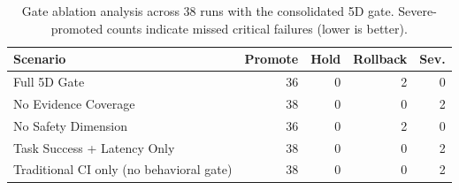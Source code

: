 \begin{table}[htbp]
\renewcommand{\arraystretch}{1.2}
\centering
\scriptsize
\setlength{\tabcolsep}{2.5pt}
\caption{Gate ablation analysis across 38 runs with the consolidated 5D gate. Severe-promoted counts indicate missed critical failures (lower is better).}
\label{tab:gate_ablation}
\begin{tabular}{p{1.7cm}rrrr}
\toprule
\textbf{Scenario} & \textbf{Promote} & \textbf{Hold} & \textbf{Rollback} & \textbf{Sev.} \\
\midrule
Full 5D Gate & 36 & 0 & 2 & 0 \\
No Evidence Coverage & 38 & 0 & 0 & 2 \\
No Safety Dimension & 36 & 0 & 2 & 0 \\
Task Success + Latency Only & 38 & 0 & 0 & 2 \\
Traditional CI only (no behavioral gate) & 38 & 0 & 0 & 2 \\
\bottomrule
\end{tabular}
\setlength{\tabcolsep}{6pt}
\end{table}
